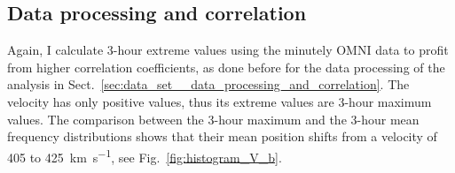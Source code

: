 \subsection{Data processing and correlation}
Again, I calculate 3-hour extreme values using the minutely OMNI data to profit from higher correlation coefficients, as done before for the data processing of the \vBz{} analysis in Sect.~\ref{sec:data_set__data_processing_and_correlation}. The velocity has only positive values, thus its extreme values are 3-hour maximum values. The comparison between the 3-hour maximum and the 3-hour mean frequency distributions shows that their mean position shifts from a velocity of 405 to \SI{425}{\km\per\s}, see Fig.~\ref{fig:histogram_V_b}.
\begin{figure}[htb]
	\begin{floatrow}
\end{floatrow}
\end{figure}
